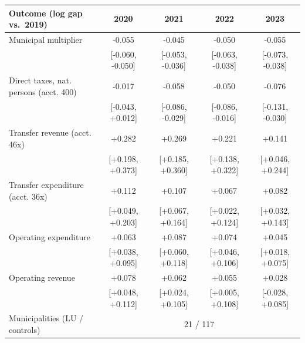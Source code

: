 \begin{tabular}{lcccc}
\toprule
Outcome (log gap vs.\ 2019) & 2020 & 2021 & 2022 & 2023 \\
\midrule
Municipal multiplier & -0.055 & -0.045 & -0.050 & -0.055 \\
 & [-0.060, -0.050] & [-0.053, -0.036] & [-0.063, -0.038] & [-0.073, -0.038] \\
Direct taxes, nat. persons (acct. 400) & -0.017 & -0.058 & -0.050 & -0.076 \\
 & [-0.043, +0.012] & [-0.086, -0.029] & [-0.086, -0.016] & [-0.131, -0.030] \\
Transfer revenue (acct. 46x) & +0.282 & +0.269 & +0.221 & +0.141 \\
 & [+0.198, +0.373] & [+0.185, +0.360] & [+0.138, +0.322] & [+0.046, +0.244] \\
Transfer expenditure (acct. 36x) & +0.112 & +0.107 & +0.067 & +0.082 \\
 & [+0.049, +0.203] & [+0.067, +0.164] & [+0.022, +0.124] & [+0.032, +0.143] \\
Operating expenditure & +0.063 & +0.087 & +0.074 & +0.045 \\
 & [+0.038, +0.095] & [+0.060, +0.118] & [+0.046, +0.106] & [+0.018, +0.075] \\
Operating revenue & +0.078 & +0.062 & +0.055 & +0.028 \\
 & [+0.048, +0.112] & [+0.024, +0.105] & [+0.005, +0.108] & [-0.028, +0.085] \\
\midrule
Municipalities (LU / controls) & \multicolumn{4}{c}{21 / 117} \\
\bottomrule
\end{tabular}